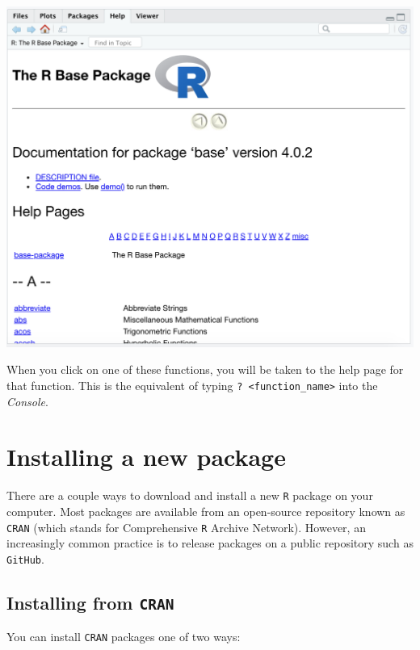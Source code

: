 \documentclass[
]{book}
\begin{document}
\includegraphics{img/rstudio_base-package.png}

When you click on one of these functions, you will be taken to the help page for that function. This is the equivalent of typing \texttt{?\ \textless{}function\_name\textgreater{}} into the \emph{Console}.

\hypertarget{installing-a-new-package}{%
\section*{Installing a new package}\label{installing-a-new-package}}

There are a couple ways to download and install a new \texttt{R} package on your computer. Most packages are available from an open-source repository known as \texttt{CRAN} (which stands for Comprehensive \texttt{R} Archive Network). However, an increasingly common practice is to release packages on a public repository such as \texttt{GitHub}.

\hypertarget{installing-from-cran}{%
\subsection*{\texorpdfstring{Installing from \texttt{CRAN}}{Installing from CRAN}}\label{installing-from-cran}}

You can install \texttt{CRAN} packages one of two ways:
\end{document}
